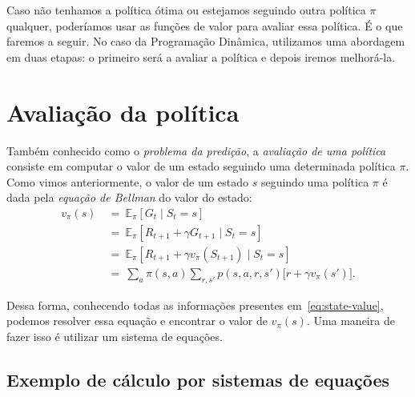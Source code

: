 \documentclass{article}
\begin{document}
            Caso não tenhamos a política ótima ou estejamos seguindo outra política $\pi$ qualquer, poderíamos usar as funções de valor para avaliar essa política. É o que faremos a seguir. No caso da Programação Dinâmica, utilizamos uma abordagem em duas etapas: o primeiro será a avaliar a política e depois iremos melhorá-la.
            
    \section{Avaliação da política}
    
        Também conhecido como o \emph{problema da predição}, a \emph{avaliação de uma política} consiste em computar o valor de um estado seguindo uma determinada política $\pi$. Como vimos anteriormente, o valor de um estado $s$ seguindo uma política $\pi$ é dada pela \emph{equação de Bellman} do valor do estado:
        \begin{equation}
            \label{eq:state-value}
            \begin{aligned}
                v_{\pi}(s) 
                & \ = \ \mathbb{E}_{\pi} \left[ G_t \mid S_t = s \right] \\
                & \ = \ \mathbb{E}_{\pi} \left[ R_{t+1} + \gamma G_{t+1} \mid S_t = s \right] \\
                & \ = \ \mathbb{E}_{\pi} \left[ R_{t+1} + \gamma v_{\pi}(S_{t+1}) \mid S_t = s \right] \\
                & \ = \ \sum_a \pi(s, a) \sum_{r, s'} p(s, a, r, s') \Big[ r + \gamma v_{\pi}(s') \Big] .
            \end{aligned}
        \end{equation}
    
        Dessa forma, conhecendo todas as informações presentes em~\eqref{eq:state-value}, podemos resolver essa equação e encontrar o valor de $v_{\pi}(s)$. Uma maneira de fazer isso é utilizar um sistema de equações.
    
        \subsection{Exemplo de cálculo por sistemas de equações}
        
\end{document}

